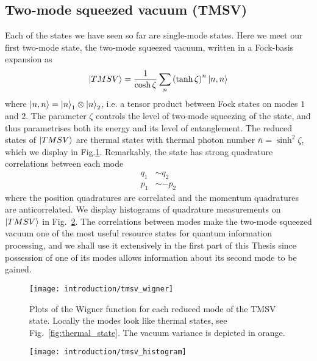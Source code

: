 \subsection{Two-mode squeezed vacuum (TMSV)}
Each of the states we have seen so far are single-mode states. Here we meet our first two-mode state, the two-mode squeezed vacuum, written in a Fock-basis expansion as
\begin{equation}\label{eqn:intro_tmsv}
\ket{TMSV} = \frac{1}{\cosh \zeta} \sum_n \left( \tanh \zeta \right)^n \ket{n, n}
\end{equation}
where $\ket{n, n} = \ket{n}_1 \otimes \ket{n}_2$, i.e. a tensor product between Fock states on modes $1$ and $2$. The parameter $\zeta$ controls the level of two-mode squeezing of the state, and thus parametrises both its energy and its level of entanglement. The reduced states of $\ket{TMSV}$ are thermal states with thermal photon number $\bar{n} = \sinh^2 \zeta$, which we display in Fig.\ref{fig:tmsv_wigner}. Remarkably, the state has strong quadrature correlations between each mode
\begin{align*}
q_1 &\sim q_2 \\
p_1 &\sim - p_2
\end{align*}
where the position quadratures are correlated and the momentum quadratures are anticorrelated. We display histograms of quadrature measurements on $\ket{TMSV}$ in Fig.~\ref{fig:tmsv_histogram}. The correlations between modes make the two-mode squeezed vacuum one of the most useful resource states for quantum information processing, and we shall use it extensively in the first part of this Thesis since possession of one of its modes allows information about its second mode to be gained.


\begin{figure}[htp]
\captionsetup{width=0.8\linewidth}
\centering
\texttt{[image: introduction/tmsv\_wigner]}
\caption{\label{fig:tmsv_wigner} Plots of the Wigner function for each reduced mode of the TMSV state. Locally the modes look like thermal states, see Fig.~\ref{fig:thermal_state}. The vacuum variance is depicted in orange.}
\end{figure}

\begin{figure}[htp]
\captionsetup{width=0.8\linewidth}
\centering
\texttt{[image: introduction/tmsv\_histogram]}
\caption{\label{fig:tmsv_histogram} }
\end{figure}



